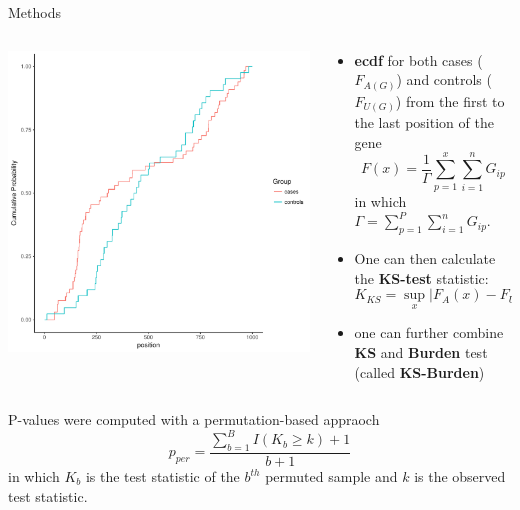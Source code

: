 \documentclass{beamer}
\begin{document}
\begin{frame}[t]{Methods}
  \tiny
  \begin{columns}
    \begin{column}{0.5\textwidth}
      \includegraphics[width=0.9\linewidth]{plots/ks_example.pdf}
    \end{column}
    \begin{column}{0.5\textwidth}
      \begin{itemize}
        \item \textbf{ecdf} for both cases ($F_{A(G)}$) and controls ($F_{U(G)}$) from the first to the last position of the gene 
          \begin{equation}
            F(x) = \frac{1}{\Gamma} \sum^x_{p=1}\sum^n_{i=1}G_{ip}
          \end{equation}
          in which $\Gamma = \sum^P_{p=1}\sum^n_{i=1} G_{ip}$.
        \item One can then calculate the \textbf{KS-test} statistic:
          \begin{equation}
            K_{KS} = \sup_x | F_A(x) - F_U(x) |
          \end{equation}
        \item one can further combine \textbf{KS} and \textbf{Burden} test (called \textbf{KS-Burden})
      \end{itemize}
    \end{column}
  \end{columns}
  \begin{center}
    P-values were computed with a permutation-based appraoch
    \begin{equation}
      p_{per} = \frac{\sum^B_{b=1} I(K_b \geq k)+1}{b+1}
    \end{equation}
    in which $K_b$ is the test statistic of the $b^{th}$ permuted sample and $k$ is the observed test statistic.
  \end{center}
\end{frame}
\end{document}
